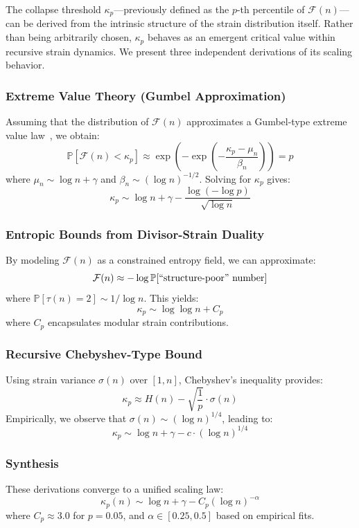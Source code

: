 \documentclass[11pt]{article}
\begin{document}
The collapse threshold \(\kappa_p\)—previously defined as the \(p\)-th percentile of \(\mathcal{F}(n)\)—can be derived from the intrinsic structure of the strain distribution itself. Rather than being arbitrarily chosen, $\kappa_p$ behaves as an emergent critical value within recursive strain dynamics. We present three independent derivations of its scaling behavior.

\subsubsection*{Extreme Value Theory (Gumbel Approximation)}
Assuming that the distribution of \(\mathcal{F}(n)\) approximates a Gumbel-type extreme value law~\cite{gumbel}, we obtain:
\[
\mathbb{P}[\mathcal{F}(n) < \kappa_p] \approx \exp\left(-\exp\left(-\frac{\kappa_p - \mu_n}{\beta_n}\right)\right) = p
\]
where $\mu_n \sim \log n + \gamma$ and $\beta_n \sim (\log n)^{-1/2}$. Solving for $\kappa_p$ gives:
\[
\kappa_p \sim \log n + \gamma - \frac{\log(-\log p)}{\sqrt{\log n}}
\]

\subsubsection*{Entropic Bounds from Divisor-Strain Duality}
By modeling $\mathcal{F}(n)$ as a constrained entropy field, we can approximate:
\[
\mathcal{F}(n) \approx -\log \mathbb{P}[\text{\textquotedblleft{}structure-poor\textquotedblright{} number}]
\]
where $\mathbb{P}[\tau(n)=2] \sim 1/\log n$. This yields:
\[
\kappa_p \sim \log \log n + C_p
\]
where $C_p$ encapsulates modular strain contributions.

\subsubsection*{Recursive Chebyshev-Type Bound}
Using strain variance $\sigma(n)$ over $[1,n]$, Chebyshev's inequality provides:
\[
\kappa_p \approx H(n) - \sqrt{\frac{1}{p}} \cdot \sigma(n)
\]
Empirically, we observe that \(\sigma(n) \sim (\log n)^{1/4}\), leading to:
\[
\kappa_p \sim \log n + \gamma - c \cdot (\log n)^{1/4}
\]

\subsubsection*{Synthesis}
These derivations converge to a unified scaling law:
\[
\boxed{\kappa_p(n) \sim \log n + \gamma - C_p (\log n)^{-\alpha}}
\]
where \(C_p \approx 3.0\) for \(p = 0.05\), and \(\alpha \in [0.25, 0.5]\) based on empirical fits.
\end{document}

